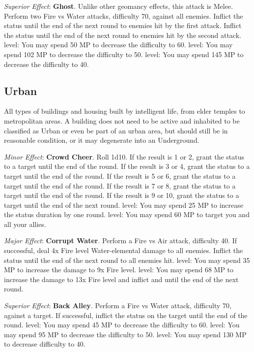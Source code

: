 \begin{multicols}{2}
\textit{Superior Effect}: \textbf{Ghost}. Unlike other geomancy effects, this attack is Melee. Perform two Fire vs Water attacks, difficulty 70, against all enemies. Inflict the  status until the end of the next round to enemies hit by the first attack. Inflict the  status until the end of the next round to enemies hit by the second attack.  level: You may spend 50 MP to decrease the difficulty to 60.  level: You may spend 102 MP to decrease the difficulty to 50.  level: You may spend 145 MP to decrease the difficulty to 40.

\subsection*{Urban}\label{subsec:geo-urban}
All types of buildings and housing built by intelligent life, from elder temples to metropolitan areas. A building does not need to be active and inhabited to be classified as Urban or even be part of an urban area, but should still be in reasonable condition, or it may degenerate into an Underground.

\textit{Minor Effect}: \textbf{Crowd Cheer}. Roll 1d10. If the result is 1 or 2, grant the  status to a target until the end of the round. If the result is 3 or 4, grant the  status to a target until the end of the round. If the result is 5 or 6, grant the  status to a target until the end of the round. If the result is 7 or 8, grant the  status to a target until the end of the round. If the result is 9 or 10, grant the  status to a target until the end of the next round.  level: You may spend 25 MP to increase the status duration by one round.  level: You may spend 60 MP to target you and all your allies.

\textit{Major Effect}: \textbf{Corrupt Water}. Perform a Fire vs Air attack, difficulty 40. If successful, deal 4x Fire level Water-elemental damage to all enemies. Inflict the  status until the end of the next round to all enemies hit.  level: You may spend 35 MP to increase the damage to 9x Fire level.  level: You may spend 68 MP to increase the damage to 13x Fire level and inflict  and  until the end of the next round.

\textit{Superior Effect}: \textbf{Back Alley}. Perform a Fire vs Water attack, difficulty 70, against a target. If successful, inflict the  status on the target until the end of the round.  level: You may spend 45 MP to decrease the difficulty to 60.  level: You may spend 95 MP to decrease the difficulty to 50.  level: You may spend 130 MP to decrease difficulty to 40.


\end{multicols}
